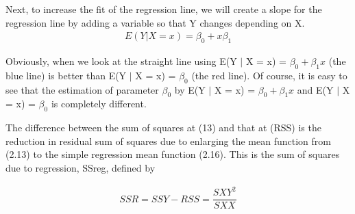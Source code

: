 \documentclass{article}
\begin{document}
    Next, to increase the fit of the regression line, we will create a slope for the regression line by adding a variable so that Y changes depending on X.
	\begin{align} \label{eq2}
        E(Y | X = x) = \beta_{0} + x\beta_{1}
    \end{align}
    
    \begin{center}
    \end{center}
    
    Obviously, when we look at the straight line using E(Y $|$ X = x) = $\beta_{0} + \beta_{1}x$ (the blue line) is better than E(Y $|$ X = x) = $\beta_{0}$ (the red line). Of course, it is easy to see that the estimation of parameter $\beta_{0}$ by E(Y $|$ X = x) = $\beta_{0} + \beta_{1}x$ and E(Y $|$ X = x) = $\beta_{0}$ is completely different.
    
    The difference between the sum of squares at (13) and that at (RSS) is the reduction in residual sum of squares due to enlarging the mean function from (2.13) to the simple regression mean function (2.16). This is the sum of squares due to regression, SSreg, defined by
    
	\begin{align} \label{eq2}
        SSR = SSY - RSS =  \dfrac{SXY^{2}}{SXX}
    \end{align}
   
\end{document}
